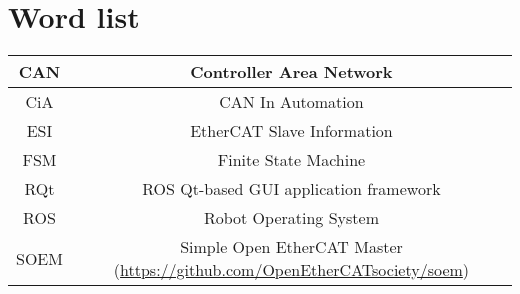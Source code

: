 \section{Word list}


\begin{center}

	\begin{tabular}{|c|c|}
		\hline
		CAN & Controller Area Network \\
		\hline
		CiA & CAN In Automation \\
		\hline
		ESI & EtherCAT Slave Information \\
		\hline
		FSM & Finite State Machine \\
		\hline
		RQt & ROS Qt-based GUI application framework \\
		\hline
		ROS & Robot Operating System \\
		\hline
		SOEM & Simple Open EtherCAT Master (\url{https://github.com/OpenEtherCATsociety/soem}) \\
		\hline
	\end{tabular}

\end{center}


